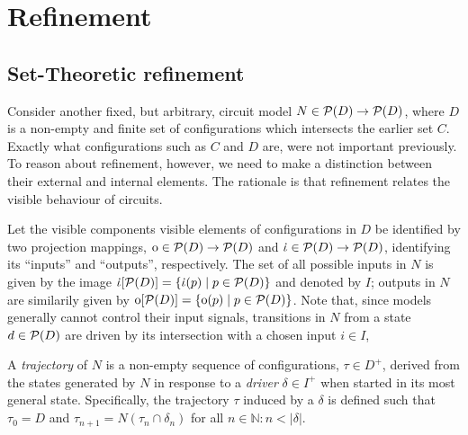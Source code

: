 \section{Refinement}

\subsection{Set-Theoretic refinement}

Consider another fixed, but arbitrary, circuit model $N \in \mathcal{P}(D) \rightarrow \mathcal{P}(D)$, where $D$ is a non-empty and finite set of configurations which intersects the earlier set $C$. Exactly what configurations such as $C$ and $D$ are, were not important previously. To reason about refinement, however, we need to make a distinction between their external and internal elements. The rationale is that refinement relates the visible behaviour of circuits. 


Let the visible components visible elements of configurations in $D$ be identified by two projection mappings, $\operatorname{\mathrm{o}} \in \mathcal{P}(D) \rightarrow \mathcal{P}(D)$ and $\operatorname{\dot{\iota}} \in \mathcal{P}(D) \rightarrow \mathcal{P}(D)$, identifying its ``inputs'' and ``outputs'', respectively. The set of all possible inputs in $N$ is given by the image $\operatorname{\dot{\iota}}[\mathcal{P}(D)] = \{ \operatorname{\dot{\iota}}(p) \mid p \in \mathcal{P}(D) \}$ and denoted by $I$; outputs in $N$ are similarily given by $\operatorname{\mathrm{o}}[\mathcal{P}(D)] = \{ \operatorname{\mathrm{o}}(p) \mid p \in \mathcal{P}(D) \}$. Note that, since models generally cannot control their input signals, transitions in $N$ from a state $d \in \mathcal{P}(D)$ are driven by its intersection with a chosen input $i \in I$, 

A \textit{trajectory} of $N$ is a non-empty sequence of configurations, $\tau \in D^{+}$, derived from the states generated by $N$ in response to a \textit{driver} $\delta \in I^{+}$ when started in its most general state. Specifically, the trajectory $\tau$ induced by a $\delta$ is defined such that $\tau_{0} = D$ and $\tau_{n+1} = N(\tau_{n} \cap \delta_{n})$ for all $n \in \mathbb{N} : n < | \delta |$.  

